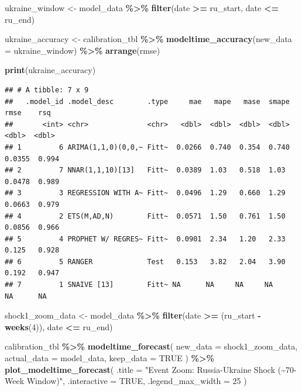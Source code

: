 \documentclass[
]{article}
\newenvironment{Shaded}{\begin{snugshade}}{\end{snugshade}}
\newcommand{\AttributeTok}[1]{\textcolor[rgb]{0.13,0.29,0.53}{#1}}
\newcommand{\ConstantTok}[1]{\textcolor[rgb]{0.56,0.35,0.01}{#1}}
\newcommand{\DecValTok}[1]{\textcolor[rgb]{0.00,0.00,0.81}{#1}}
\newcommand{\FunctionTok}[1]{\textcolor[rgb]{0.13,0.29,0.53}{\textbf{#1}}}
\newcommand{\NormalTok}[1]{#1}
\newcommand{\OtherTok}[1]{\textcolor[rgb]{0.56,0.35,0.01}{#1}}
\newcommand{\SpecialCharTok}[1]{\textcolor[rgb]{0.81,0.36,0.00}{\textbf{#1}}}
\newcommand{\StringTok}[1]{\textcolor[rgb]{0.31,0.60,0.02}{#1}}
\begin{document}
\begin{Shaded}
\begin{Highlighting}[]
\NormalTok{ukraine\_window }\OtherTok{\textless{}{-}}\NormalTok{ model\_data }\SpecialCharTok{\%\textgreater{}\%}
  \FunctionTok{filter}\NormalTok{(date }\SpecialCharTok{\textgreater{}=}\NormalTok{ ru\_start, date }\SpecialCharTok{\textless{}=}\NormalTok{ ru\_end)}

\NormalTok{ukraine\_accuracy }\OtherTok{\textless{}{-}}\NormalTok{ calibration\_tbl }\SpecialCharTok{\%\textgreater{}\%}
  \FunctionTok{modeltime\_accuracy}\NormalTok{(}\AttributeTok{new\_data =}\NormalTok{ ukraine\_window) }\SpecialCharTok{\%\textgreater{}\%}
  \FunctionTok{arrange}\NormalTok{(rmse)}

\FunctionTok{print}\NormalTok{(ukraine\_accuracy)}
\end{Highlighting}
\end{Shaded}

\begin{verbatim}
## # A tibble: 7 x 9
##   .model_id .model_desc        .type     mae   mape   mase  smape    rmse    rsq
##       <int> <chr>              <chr>   <dbl>  <dbl>  <dbl>  <dbl>   <dbl>  <dbl>
## 1         6 ARIMA(1,1,0)(0,0,~ Fitt~  0.0266  0.740  0.354  0.740  0.0355  0.994
## 2         7 NNAR(1,1,10)[13]   Fitt~  0.0389  1.03   0.518  1.03   0.0478  0.989
## 3         3 REGRESSION WITH A~ Fitt~  0.0496  1.29   0.660  1.29   0.0663  0.979
## 4         2 ETS(M,AD,N)        Fitt~  0.0571  1.50   0.761  1.50   0.0856  0.966
## 5         4 PROPHET W/ REGRES~ Fitt~  0.0901  2.34   1.20   2.33   0.125   0.928
## 6         5 RANGER             Test   0.153   3.82   2.04   3.90   0.192   0.947
## 7         1 SNAIVE [13]        Fitt~ NA      NA     NA     NA     NA      NA
\end{verbatim}

\begin{Shaded}
\begin{Highlighting}[]
\NormalTok{shock1\_zoom\_data }\OtherTok{\textless{}{-}}\NormalTok{ model\_data }\SpecialCharTok{\%\textgreater{}\%}
  \FunctionTok{filter}\NormalTok{(date }\SpecialCharTok{\textgreater{}=}\NormalTok{ (ru\_start }\SpecialCharTok{{-}} \FunctionTok{weeks}\NormalTok{(}\DecValTok{4}\NormalTok{)), date }\SpecialCharTok{\textless{}=}\NormalTok{ ru\_end)}

\NormalTok{calibration\_tbl }\SpecialCharTok{\%\textgreater{}\%}
  \FunctionTok{modeltime\_forecast}\NormalTok{(}
    \AttributeTok{new\_data    =}\NormalTok{ shock1\_zoom\_data,}
    \AttributeTok{actual\_data =}\NormalTok{ model\_data,}
    \AttributeTok{keep\_data   =} \ConstantTok{TRUE}
\NormalTok{  ) }\SpecialCharTok{\%\textgreater{}\%}
  \FunctionTok{plot\_modeltime\_forecast}\NormalTok{(}
    \AttributeTok{.title            =} \StringTok{"Event Zoom: Russia{-}Ukraine Shock (\textasciitilde{}70{-}Week Window)"}\NormalTok{,}
    \AttributeTok{.interactive      =} \ConstantTok{TRUE}\NormalTok{,}
    \AttributeTok{.legend\_max\_width =} \DecValTok{25}
\NormalTok{  )}
\end{Highlighting}
\end{Shaded}
\end{document}
